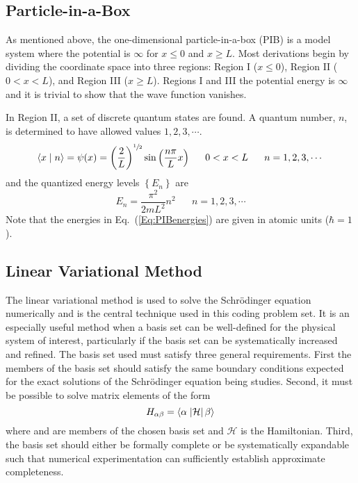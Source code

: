 %
\subsection{Particle-in-a-Box}
As mentioned above, the one-dimensional particle-in-a-box (PIB) is a model system where the potential is $\infty$ for $x \le{}0$ and $x \ge{} L$. Most derivations begin by dividing the coordinate space into three regions: Region I ($x\le{}0$), Region II ($0<x<L$), and Region III ($x\ge{}L$). Regions I and III the potential energy is $\infty$ and it is trivial to show that the wave function vanishes.

In Region II, a set of discrete quantum states are found. A quantum number, $n$, is determined to have allowed values $1, 2, 3, \cdots{}$.
%
\begin{equation}
\displaystyle
  \braket{x}{n} = \psi(x) = \left(\frac{2}{L}\right)^{\sfrac{1}{2}}\sin{\left(\frac{n \pi}{L}x\right)}
    \,\,\,\,\,\,\,\,\,\,0<x<L\,\,\,\,\,\,\,\,\,\,n=1,2,3,\cdots{}
\end{equation}
%
and the quantized energy levels $\left\{E_n\right\}$ are
%
\begin{equation}\label{Eq:PIBenergies}
\displaystyle{}
  E_n = \frac{\pi^2}{2 m L^2}n^2\,\,\,\,\,\,\,\,\,\,n=1,2,3,\cdots{}
\end{equation}
%
Note that the energies in Eq.~(\ref{Eq:PIBenergies}) are given in atomic units ($\hbar=1$).

%
\subsection{Linear Variational Method}
The linear variational method is used to solve the Schr\"{o}dinger equation numerically and is the central technique used in this coding problem set. It is an especially useful method when a basis set can be well-defined for the physical system of interest, particularly if the basis set can be systematically increased and refined. The basis set used must satisfy three general requirements. First the members of the basis set should satisfy the same boundary conditions expected for the exact solutions of the Schr\"{o}dinger equation being studies. Second, it must be possible to solve matrix elements of the form
%
\begin{equation}
\displaystyle
  H_{\alpha\beta} = \braketop{\alpha}{\mathcal{H}}{\beta}
\end{equation}
%
where \ket{\alpha} and \ket{\beta} are members of the chosen basis set and $\mathcal{H}$ is the Hamiltonian. Third, the basis set should either be formally complete or be systematically expandable such that numerical experimentation can sufficiently establish approximate completeness.
 
